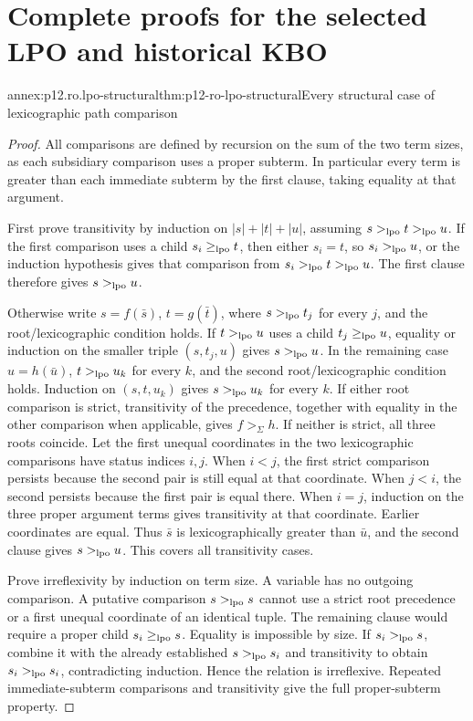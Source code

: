\section{Complete proofs for the selected LPO and historical KBO}

\begin{annexitem}{annex:p12.ro.lpo-structural}{thm:p12-ro-lpo-structural}{Every structural case of lexicographic path comparison}
\begin{proof}
All comparisons are defined by recursion on the sum of the two term
sizes, as each subsidiary comparison uses a proper subterm. In
particular every term is greater than each immediate subterm by the
first clause, taking equality at that argument.

First prove transitivity by induction on
\(\lvert s\rvert+\lvert t\rvert+\lvert u\rvert\), assuming
\(s>_{\rm lpo}t>_{\rm lpo}u\). If the first comparison uses a
child \(s_i\geq_{\rm lpo}t\), then either \(s_i=t\), so
\(s_i>_{\rm lpo}u\), or the induction hypothesis gives that
comparison from \(s_i>_{\rm lpo}t>_{\rm lpo}u\). The first
clause therefore gives \(s>_{\rm lpo}u\).

Otherwise write \(s=f(\bar s)\), \(t=g(\bar t)\), where
\(s>_{\rm lpo}t_j\) for every \(j\), and the root/lexicographic
condition holds. If \(t>_{\rm lpo}u\) uses a child
\(t_j\geq_{\rm lpo}u\), equality or induction on the smaller
triple \((s,t_j,u)\) gives \(s>_{\rm lpo}u\).
In the remaining case \(u=h(\bar u)\),
\(t>_{\rm lpo}u_k\) for every \(k\), and the second
root/lexicographic condition holds. Induction on \((s,t,u_k)\)
gives \(s>_{\rm lpo}u_k\) for every \(k\).
If either root comparison is strict, transitivity of the precedence,
together with equality in the other comparison when applicable, gives
\(f>_\Sigma h\). If neither is strict, all three roots coincide.
Let the first unequal coordinates in the two lexicographic comparisons
have status indices \(i,j\). When \(i<j\), the first strict
comparison persists because the second pair is still equal at that
coordinate. When \(j<i\), the second persists because the first
pair is equal there. When \(i=j\), induction on the three proper
argument terms gives transitivity at that coordinate. Earlier
coordinates are equal. Thus \(\bar s\) is lexicographically
greater than \(\bar u\), and the second clause gives
\(s>_{\rm lpo}u\). This covers all transitivity cases.

Prove irreflexivity by induction on term size. A variable has no
outgoing comparison. A putative comparison \(s>_{\rm lpo}s\)
cannot use a strict root precedence or a first unequal coordinate of
an identical tuple. The remaining clause would require a proper child
\(s_i\geq_{\rm lpo}s\). Equality is impossible by size. If
\(s_i>_{\rm lpo}s\), combine it with the already established
\(s>_{\rm lpo}s_i\) and transitivity to obtain
\(s_i>_{\rm lpo}s_i\), contradicting induction. Hence the
relation is irreflexive. Repeated immediate-subterm comparisons and
transitivity give the full proper-subterm property.


\end{proof}
\end{annexitem}
